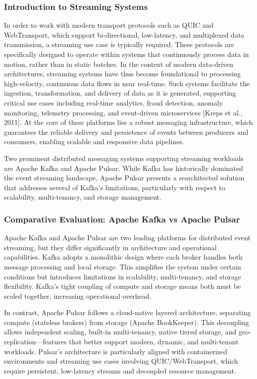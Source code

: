 \subsubsection{Introduction to Streaming Systems}
In order to work with modern transport protocols such as QUIC and WebTransport, which support bi-directional, low-latency, and multiplexed data transmission, a streaming use case is typically required. These protocols are specifically designed to operate within systems that continuously process data in motion, rather than in static batches. In the context of modern data-driven architectures, streaming systems have thus become foundational to processing high-velocity, continuous data flows in near real-time. Such systems facilitate the ingestion, transformation, and delivery of data as it is generated, supporting critical use cases including real-time analytics, fraud detection, anomaly monitoring, telemetry processing, and event-driven microservices [Kreps et al., 2011]. At the core of these platforms lies a robust messaging infrastructure, which guarantees the reliable delivery and persistence of events between producers and consumers, enabling scalable and responsive data pipelines.

Two prominent distributed messaging systems supporting streaming workloads are Apache Kafka and Apache Pulsar. While Kafka has historically dominated the event streaming landscape, Apache Pulsar presents a rearchitected solution that addresses several of Kafka's limitations, particularly with respect to scalability, multi-tenancy, and storage management.

\subsubsection{Comparative Evaluation: Apache Kafka vs Apache Pulsar}
Apache Kafka and Apache Pulsar are two leading platforms for distributed event streaming, but they differ significantly in architecture and operational capabilities. Kafka adopts a monolithic design where each broker handles both message processing and local storage. This simplifies the system under certain conditions but introduces limitations in scalability, multi-tenancy, and storage flexibility. Kafka's tight coupling of compute and storage means both must be scaled together, increasing operational overhead.

In contrast, Apache Pulsar follows a cloud-native layered architecture, separating compute (stateless brokers) from storage (Apache BookKeeper). This decoupling allows independent scaling, built-in multi-tenancy, native tiered storage, and geo-replication—features that better support modern, dynamic, and multi-tenant workloads. Pulsar's architecture is particularly aligned with containerized environments and streaming use cases involving QUIC/WebTransport, which require persistent, low-latency streams and decoupled resource management.

